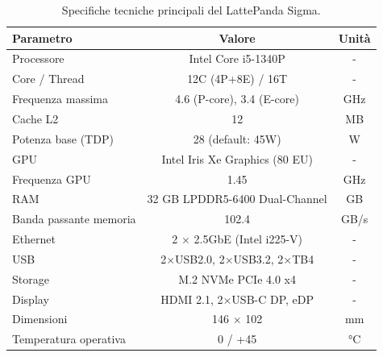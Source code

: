 \begin{table}[htbp]
    \centering
    \caption{Specifiche tecniche principali del LattePanda Sigma.}
    \label{tab:sbc_specs}
    \begin{tabular}{|l|c|c|}
        \hline
        \textbf{Parametro}     & \textbf{Valore}                                & \textbf{Unità} \\
        \hline
        Processore             & Intel Core i5-1340P                            & -              \\
        Core / Thread          & 12C (4P+8E) / 16T                              & -              \\
        Frequenza massima      & 4.6 (P-core), 3.4 (E-core)                     & GHz            \\
        Cache L2               & 12                                             & MB             \\
        Potenza base (TDP)     & 28 (default: 45W)                              & W              \\
        GPU                    & Intel Iris Xe Graphics (80 EU)                 & -              \\
        Frequenza GPU          & 1.45                                           & GHz            \\
        RAM                    & 32 GB LPDDR5-6400 Dual-Channel                 & GB             \\
        Banda passante memoria & 102.4                                          & GB/s           \\
        Ethernet               & 2 $\times$ 2.5GbE (Intel i225-V)               & -              \\
        USB                    & 2$\times$USB2.0, 2$\times$USB3.2, 2$\times$TB4 & -              \\
        Storage                & M.2 NVMe PCIe 4.0 x4                           & -              \\
        Display                & HDMI 2.1, 2$\times$USB-C DP, eDP               & -              \\
        Dimensioni             & 146 $\times$ 102                               & mm             \\
        Temperatura operativa  & 0 / +45                                        & °C             \\
        \hline
    \end{tabular}
\end{table}

